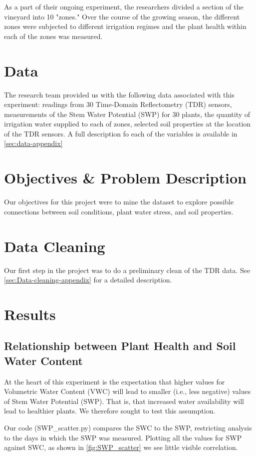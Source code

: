 \documentclass[12pt]{scrartcl}
\begin{document}
As a part of their ongoing experiment, the researchers divided a section of the vineyard into 10 "zones." Over the course of the growing season, the different zones were subjected to different irrigation regimes and the plant health within each of the zones was measured.

\section{Data}
The research team provided us with the following data associated with this experiment: readings from 30 Time-Domain Reflectometry (TDR) sensors, measurements of the Stem Water Potential (SWP) for 30 plants, the quantity of irrigation water supplied to each of zones, selected soil properties at the location of the TDR sensors. A full description fo each of the variables is available in \autoref{sec:data-appendix}



\section{Objectives \& Problem Description}
Our objectives for this project were to mine the dataset to explore possible connections between soil conditions, plant water stress, and soil properties.

\section{Data Cleaning}
Our first step in the project was to do a preliminary clean of the TDR data. See \autoref{sec:Data-cleaning-appendix} for a detailed description.




\section{Results}
\subsection{Relationship between Plant Health and Soil Water Content}\label{sec:Scatter-SWP}
At the heart of this experiment is the expectation that higher values for Volumetric Water Content (VWC) will lead to smaller (i.e., less negative) values of Stem Water Potential (SWP). That is, that increased water availability will lead to healthier plants. We therefore sought to test this assumption.

Our code (SWP\_scatter.py) compares the SWC to the SWP, restricting analysis to the days in which the SWP was measured. Plotting all the values for SWP against SWC, as shown in \autoref{fig:SWP_scatter} we see little visible correlation.
\end{document}
